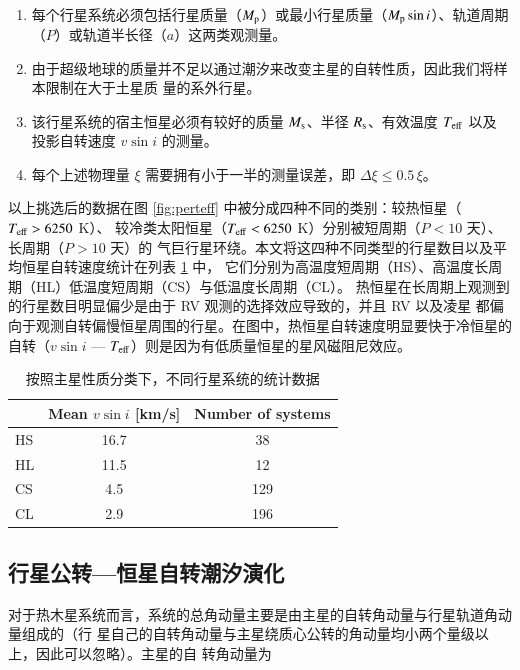 \begin{enumerate}
\item 每个行星系统必须包括行星质量（$M_\mathrm{p}$）或最小行星质量（$M_\mathrm{p} \sin i$）、轨道周期
（$P$）或轨道半长径（$a$）这两类观测量。
\item 由于超级地球的质量并不足以通过潮汐来改变主星的自转性质，因此我们将样本限制在大于土星质
量的系外行星。
\item 该行星系统的宿主恒星必须有较好的质量 $M_\mathrm{s}$、半径 $R_\mathrm{s}$、有效温度 $T_\mathrm{eff}$ 以及
投影自转速度 $v \sin i$ 的测量。
\item 每个上述物理量 $\xi$ 需要拥有小于一半的测量误差，即 $\Delta \xi  \leq 0.5 \, \xi$。
\end{enumerate}

以上挑选后的数据在图 \ref{fig:perteff} 中被分成四种不同的类别：较热恒星（$T_\mathrm{eff} > 6250 $ K）、
较冷类太阳恒星（$T_\mathrm{eff} < 6250 $ K）分别被短周期（$P < 10 $ 天）、长周期（$P >10 $ 天）的
气巨行星环绕。本文将这四种不同类型的行星数目以及平均恒星自转速度统计在列表 \ref{tbl:stat} 中，
它们分别为高温度短周期（HS）、高温度长周期（HL）低温度短周期（CS）与低温度长周期（CL）。
热恒星在长周期上观测到的行星数目明显偏少是由于 RV 观测的选择效应导致的，并且 RV 以及凌星
都偏向于观测自转偏慢恒星周围的行星。在图中，热恒星自转速度明显要快于冷恒星的自转（$v\sin i$ 
--- $T_\mathrm{eff}$）则是因为有低质量恒星的星风磁阻尼效应\cite{Kraft1967}。

{\renewcommand{\arraystretch}{1.3}
\begin{table}[t]
\centering
\caption{按照主星性质分类下，不同行星系统的统计数据}
\label{tbl:stat}
\begin{tabularx}{0.9\textwidth}{@{\extracolsep{\fill}}lcc}
\toprule
  &  Mean $v \sin i $ [km/s]  & Number of systems \\ \midrule 
HS & 16.7       & 38                \\ 
HL & 11.5       & 12                 \\ 
CS & 4.5        & 129               \\ 
CL & 2.9        & 196                \\ \bottomrule
\end{tabularx}
\end{table}
}

\subsection{行星公转---恒星自转潮汐演化}

对于热木星系统而言，系统的总角动量主要是由主星的自转角动量与行星轨道角动量组成的（行
星自己的自转角动量与主星绕质心公转的角动量均小两个量级以上，因此可以忽略）。主星的自
转角动量为

